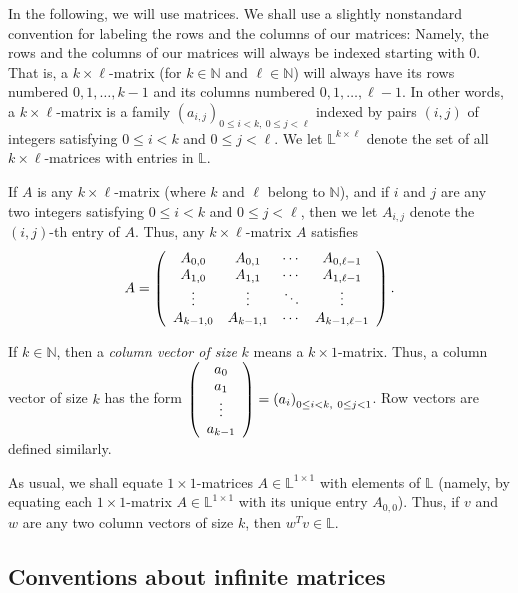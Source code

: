 \documentclass[numbers=enddot,12pt,final,onecolumn,notitlepage]{scrartcl}%
\theoremstyle{definition}
\begin{document}
In the following, we will use matrices. We shall use a slightly nonstandard
convention for labeling the rows and the columns of our matrices: Namely, the
rows and the columns of our matrices will always be indexed starting with $0$.
That is, a $k\times\ell$-matrix (for $k\in\mathbb{N}$ and $\ell\in\mathbb{N}$)
will always have its rows numbered $0,1,\ldots,k-1$ and its columns numbered
$0,1,\ldots,\ell-1$. In other words, a $k\times\ell$-matrix is a family
$\left(  a_{i,j}\right)  _{0\leq i<k,\ 0\leq j<\ell}$ indexed by pairs
$\left(  i,j\right)  $ of integers satisfying $0\leq i<k$ and $0\leq j<\ell$.
We let $\mathbb{L}^{k\times\ell}$ denote the set of all $k\times\ell$-matrices
with entries in $\mathbb{L}$.

If $A$ is any $k\times\ell$-matrix (where $k$ and $\ell$ belong to
$\mathbb{N}$), and if $i$ and $j$ are any two integers satisfying $0\leq i<k$
and $0\leq j<\ell$, then we let $A_{i,j}$ denote the $\left(  i,j\right)  $-th
entry of $A$. Thus, any $k\times\ell$-matrix $A$ satisfies%
\[
A=\left(
\begin{array}
[c]{cccc}%
A_{0,0} & A_{0,1} & \cdots & A_{0,\ell-1}\\
A_{1,0} & A_{1,1} & \cdots & A_{1,\ell-1}\\
\vdots & \vdots & \ddots & \vdots\\
A_{k-1,0} & A_{k-1,1} & \cdots & A_{k-1,\ell-1}%
\end{array}
\right)  .
\]


If $k\in\mathbb{N}$, then a \textit{column vector of size }$k$ means a
$k\times1$-matrix. Thus, a column vector of size $k$ has the form $\left(
\begin{array}
[c]{c}%
a_{0}\\
a_{1}\\
\vdots\\
a_{k-1}%
\end{array}
\right)  = \left(  a_{i}\right)  _{0\leq i<k,\ 0\leq j<1}$. Row vectors are
defined similarly.

As usual, we shall equate $1\times1$-matrices $A\in\mathbb{L}^{1\times1}$ with
elements of $\mathbb{L}$ (namely, by equating each $1\times1$-matrix
$A\in\mathbb{L}^{1\times1}$ with its unique entry $A_{0,0}$). Thus, if $v$ and
$w$ are any two column vectors of size $k$, then $w^{T}v\in\mathbb{L}$.

\subsection{\label{subsect.form.inf-mat}Conventions about infinite matrices}
\end{document}
